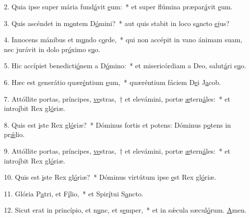 2. Quia ipse super mária fund\uline{á}vit \uline{e}um:~* et super flúmina præpar\uline{á}vit \uline{e}um.\par 
3. Quis ascéndet in m\uline{o}ntem D\uline{ó}mini?~* aut quis stabit in loco s\uline{a}ncto \uline{e}jus?\par 
4. Innocens mánibus et m\uline{u}ndo c\uline{o}rde,~* qui non accépit in vano ánimam suam, nec jurávit in dolo pr\uline{ó}ximo s\uline{u}o.\par 
5. Hic accípiet benedicti\uline{ó}nem a D\uline{ó}mino:~* et misericórdiam a Deo, salut\uline{á}ri s\uline{u}o.\par 
6. Hæc est generátio quær\uline{é}ntium \uline{e}um,~* quæréntium fáciem D\uline{e}i J\uline{a}cob.\par 
7. Attóllite portas, príncipes, \uline{ve}stras,~† et elevámini, portæ \uline{æ}tern\uline{á}les:~* et intro\uline{í}bit Rex gl\uline{ó}riæ.\par 
8. Quis est \uline{i}ste Rex gl\uline{ó}riæ?~* Dóminus fortis et potens: Dóminus p\uline{o}tens in pr\uline{ǽ}lio.\par 
9. Attóllite portas, príncipes, \uline{ve}stras,~† et elevámini, portæ \uline{æ}tern\uline{á}les:~* et intro\uline{í}bit Rex gl\uline{ó}riæ.\par 
10. Quis est \uline{i}ste Rex gl\uline{ó}riæ?~* Dóminus virtútum ipse \uline{e}st Rex gl\uline{ó}riæ.\par 
11. Glória P\uline{a}tri, et F\uline{í}lio,~* et Spir\uline{í}tui S\uline{a}ncto.\par 
12. Sicut erat in princípio, et n\uline{u}nc, et s\uline{e}mper,~* et in sǽcula sæcul\uline{ó}rum. \uline{A}men.\par 
